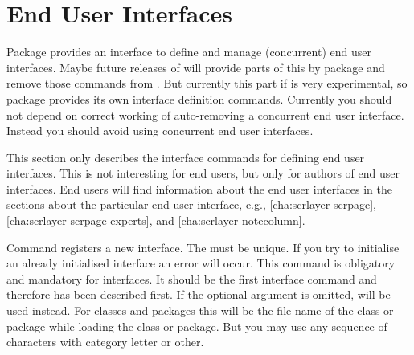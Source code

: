 \section{End User Interfaces}
\label{sec:scrlayer.enduserinterfaces}

Package  provides an interface to define and manage
(concurrent) end user interfaces. Maybe future releases of \KOMAScript{} will
provide parts of this by package  and remove those commands
from . But currently this part if  is very
experimental, so package  provides its own interface
definition commands. Currently you should not depend on correct working of
auto-removing a concurrent end user interface. Instead you should avoid using
concurrent end user interfaces.

This section only describes the interface commands for defining end user
interfaces. This is not interesting for end users, but only for authors of end
user interfaces. End users will find information about the end user interfaces
in the sections about the particular end user interface, e.g.,
\autoref{cha:scrlayer-scrpage}, \autoref{cha:scrlayer-scrpage-experts}, and
\autoref{cha:scrlayer-notecolumn}.

\begin{Declaration}
\end{Declaration}
%
Command 
registers a new interface. The  must be unique. If you
try to initialise an already initialised interface an error will occur. This
command is obligatory and mandatory for interfaces. It should be the first
interface command and therefore has been described first. If the optional
argument is omitted,  will be
used instead. For classes and packages this will be the file name of the class
or package while loading the class or package. But you may use any sequence of
characters with category letter or other.%

